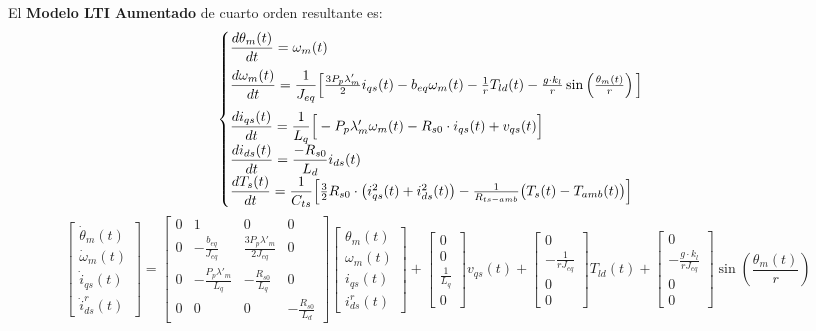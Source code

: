 \documentclass[12pt, a4paper,journal, onecolumn, compsoc]{IEEEtran}
\begin{document}
El \textbf{Modelo LTI Aumentado} de cuarto orden resultante es:
\begin{equation} \label{eq:sis_escalar_LTI_aug}
\begin{cases}
    \vspace{0.2cm}
    \dfrac{d\theta_m(t)}{dt} = \omega_m(t) \\
    \vspace{0.2cm}
    \dfrac{d\omega_m(t)}{dt} = \dfrac{1}{J_{eq}}\Big[\frac{3 P_p \lambda'_m}{2} i_{qs}(t) - b_{eq} \omega_m(t) - \frac{1}{r} T_{ld}(t) - \frac{g\cdot k_l}{r} \sin\left(\frac{\theta_m(t)}{r}\right)\Big] \\
    \dfrac{di_{qs}(t)}{dt} = \dfrac{1}{L_q}\Big[-P_p \lambda'_m \omega_m(t) - R_{s0}\cdot i_{qs}(t) + v_{qs}(t)\Big] \\
    \dfrac{di_{ds}(t)}{dt} = \dfrac{-R_{s0}}{L_d}i_{ds}(t)\\
    \dfrac{dT_s(t)}{dt} = \dfrac{1}{C_{ts}}\Big[\frac{3}{2}R_{s0}\cdot \big(i_{qs}^2(t)+i_{ds}^2(t)\big)-\frac{1}{R_{ts-amb}}\big(T_s(t) - T_{amb}(t)\big)\Big]
\end{cases}
\end{equation}
\begingroup
\renewcommand{\arraystretch}{1.8} 
\footnotesize\begin{equation}
\begin{bmatrix}
\dot{\theta}_m (t)\\
\dot{\omega}_m(t)\\
\dot{i}_{qs}(t)\\
\dot{i}_{ds}^r(t)
\end{bmatrix}
= 
\begin{bmatrix}
0 & 1 & 0 & 0 \\
0  & -\frac{b_{eq}}{J_{eq}} & \frac{3 P_p \lambda'_m}{2 J_{eq}} & 0 \\
 0 &  -\frac{P_p \lambda'_m}{L_q} & -\frac{R_{s0}}{L_q} & 0 \\
 0 & 0 & 0 & -\frac{R_{s0}}{L_d}
\end{bmatrix}
\begin{bmatrix}
\theta_m(t) \\
\omega_m (t)\\
i_{qs}(t) \\
i_{ds}^r(t)
\end{bmatrix}
+
\begin{bmatrix}
0  \\
0  \\
\frac{1}{L_q} \\
0
\end{bmatrix}
v_{qs}(t) 
+
\begin{bmatrix}
0 \\
-\frac{1}{rJ_{eq}} \\
0 \\
0
\end{bmatrix}
T_{ld}(t)
+
\begin{bmatrix}
    0 \\
    -\frac{g\cdot k_l}{rJ_{eq}} \\
    0 \\
    0
\end{bmatrix}
\sin{\left(\frac{\theta_m(t)}{r}\right)}
\end{equation}\normalsize
\endgroup
\end{document}
